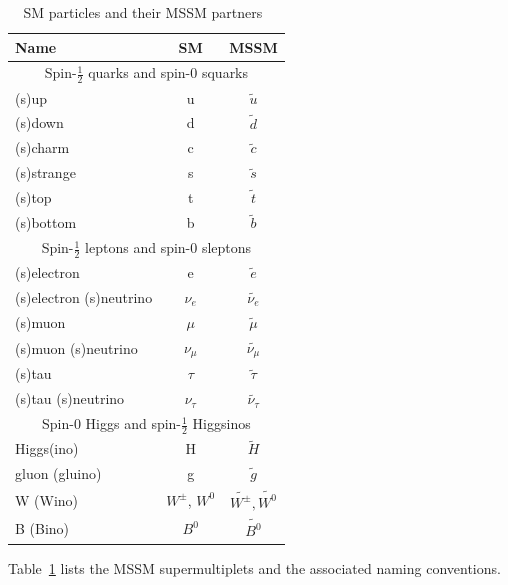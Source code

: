 			\begin{table}[!thp]
				\centering
				\caption{SM particles and their MSSM partners~\cite{pdg}}
				\begin{tabular}{| l | c | c |}
				\hline
				Name 				& SM 	& MSSM \\[1ex] \hline
				\multicolumn{3}{|c|}{Spin-$\frac{1}{2}$ quarks and spin-$0$ squarks} \\[1ex] \hline
				(s)up 				& u 	& $\tilde{u}$ \\ \hline
				(s)down 			& d 	& $\tilde{d}$ \\ \hline
				(s)charm 			& c 	& $\tilde{c}$ \\ \hline
				(s)strange 			& s		& $\tilde{s}$ \\ \hline
				(s)top 				& t 	& $\tilde{t}$ \\ \hline
				(s)bottom 			& b 	& $\tilde{b}$ \\[1ex] \hline
				\multicolumn{3}{|c|}{Spin-$\frac{1}{2}$ leptons and spin-$0$ sleptons} \\[1ex] \hline
				(s)electron 		& e 	& $\tilde{e}$ \\ \hline
				(s)electron (s)neutrino 	& $\nu_e$ 	& $\widetilde{\nu_e}$ \\ \hline
				(s)muon 			& $\mu$ 	& $\tilde{\mu}$ \\ \hline
				(s)muon (s)neutrino & $\nu_\mu$ 	& $\widetilde{\nu_\mu}$ \\ \hline
				(s)tau 				& $\tau$ 	& $\tilde{\tau}$ \\ \hline
				(s)tau (s)neutrino 	& $\nu_\tau$ 	& $\widetilde{\nu_\tau}$ \\[1ex] \hline
				\multicolumn{3}{|c|}{Spin-$0$ Higgs and spin-$\frac{1}{2}$ Higgsinos} \\[1ex] \hline
				Higgs(ino)			& H 	& $\tilde{H}$ \\ \hline
				gluon (gluino) 		& g 	& $\tilde{g}$ \\[1ex] \hline
				W (Wino) 			& $W^{\pm}$, $W^0$ & $\widetilde{W^\pm}, \widetilde{W^0}$ \\[1ex] \hline
				B (Bino) 			& $B^0$ & $\widetilde{B^0}$ \\[1ex] \hline

 				\end{tabular}
				\label{tab:MSSM}
			\end{table}

		Table~\ref{tab:MSSM} lists the MSSM supermultiplets and the associated naming conventions.

